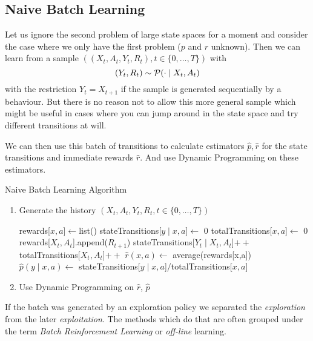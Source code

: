 \subsection{Naive Batch Learning}
Let us ignore the second problem of large state spaces for a moment and consider the case where we only have the first problem (\(p\) and \(r\) unknown). Then we can learn from a sample \(((X_t, A_t, Y_t, R_t), t\in\{0,\dots, T\})\) with
\[
	(Y_t,R_t)\sim \mathcal{P}(\cdot \mid X_t, A_t)
\]
with the restriction \(Y_t=X_{t+1}\) if the sample is generated sequentially by a behaviour. But there is no reason not to allow this more general sample which might be useful in cases where you can jump around in the state space and try different transitions at will. 

We can then use this batch of transitions to calculate estimators \(\hat{p},\hat{r}\) for the state transitions and immediate rewards \(\hat{r}\). And use Dynamic Programming on these estimators.

\begin{algorithm}
	\caption{Naive Batch Learning Algorithm} \label{naive batch learning algorithm}
	\begin{enumerate}
		\item Generate the history \((X_t, A_t, Y_t, R_t, t\in\{0,\dots, T\})\)
		\begin{algorithmic}[1] 
			 
				\State rewards[\(x,a\)]\(\gets\)list() 
				\State stateTransitions[\(y\mid x,a\)]\(\gets\) 0
				\State totalTransitions[\(x,a\)]\(\gets\) 0
			\EndFor
				\State rewards[\(X_t,A_t\)].append(\(R_{t+1}\))
				\State stateTransitions[\(Y_t\mid X_t,A_t\)]\(++\) \label{algo1: incr 1}
				\State totalTransitions[\(X_t,A_t\)]\(++\)\label{algo1: incr 2}
			\EndFor
				\State \(\hat{r}(x,a) \gets\) average(rewards[x,a])
					\State \(\hat{p}(y\mid x,a)\gets\) stateTransitions[\(y\mid x,a\)]\(/\)totalTransitions[\(x,a\)]\label{calculation of hat p}
				\EndFor
			\EndFor
		\end{algorithmic}
		\item Use Dynamic Programming on \(\hat{r}\), \(\hat{p}\) 
	\end{enumerate}
\end{algorithm}

If the batch was generated by an exploration policy we separated the \emph{exploration} from the later \emph{exploitation}. The methods which do that are often grouped under the term \emph{Batch Reinforcement Learning} or \emph{off-line} learning. 

